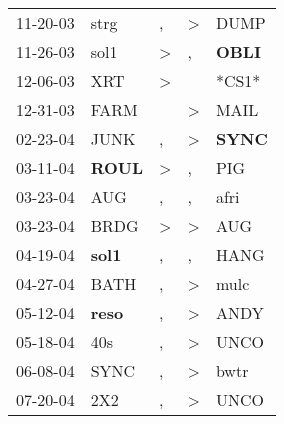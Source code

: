 \begin{supertabular}{p{0.07\textwidth}p{0.06\textwidth}p{0.02\textwidth}p{0.02\textwidth}p{0.06\textwidth}}
          11-20-03\textsuperscript{} &           strg\textsuperscript{} &                , &     \textgreater &           DUMP\textsuperscript{} \\
          11-26-03\textsuperscript{} &           sol1\textsuperscript{} &     \textgreater &                , &  \textbf{OBLI\textsuperscript{}} \\
          12-06-03\textsuperscript{} &            XRT\textsuperscript{} &     \textgreater &                  &                            *CS1* \\
          12-31-03\textsuperscript{} &           FARM\textsuperscript{} &                  &     \textgreater &           MAIL\textsuperscript{} \\
          02-23-04\textsuperscript{} &           JUNK\textsuperscript{} &                , &     \textgreater &  \textbf{SYNC\textsuperscript{}} \\
          03-11-04\textsuperscript{} &  \textbf{ROUL\textsuperscript{}} &     \textgreater &                , &            PIG\textsuperscript{} \\
          03-23-04\textsuperscript{} &            AUG\textsuperscript{} &                , &                , &           afri\textsuperscript{} \\
          03-23-04\textsuperscript{} &           BRDG\textsuperscript{} &     \textgreater &     \textgreater &            AUG\textsuperscript{} \\
          04-19-04\textsuperscript{} &  \textbf{sol1\textsuperscript{}} &                , &                , &           HANG\textsuperscript{} \\
          04-27-04\textsuperscript{} &           BATH\textsuperscript{} &                , &     \textgreater &           mulc\textsuperscript{} \\
          05-12-04\textsuperscript{} &  \textbf{reso\textsuperscript{}} &                , &     \textgreater &           ANDY\textsuperscript{} \\
          05-18-04\textsuperscript{} &            40s\textsuperscript{} &                , &     \textgreater &           UNCO\textsuperscript{} \\
          06-08-04\textsuperscript{} &           SYNC\textsuperscript{} &                , &     \textgreater &           bwtr\textsuperscript{} \\
          07-20-04\textsuperscript{} &            2X2\textsuperscript{} &                , &     \textgreater &           UNCO\textsuperscript{} \\

\end{supertabular}
